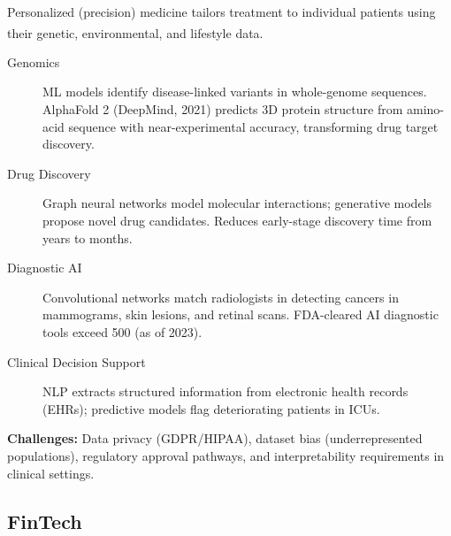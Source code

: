     \begin{tcbitemize}[ skin=sectionraster ]
        \tcbitem[title={AI in Personalized Medicine}, raster multicolumn=6]
        Personalized (precision) medicine tailors treatment to individual patients using their genetic, environmental, and lifestyle data.\textsuperscript{\cite{adjaouteAI2024}}

        \begin{description}
            \item[Genomics] ML models identify disease-linked variants in whole-genome sequences. AlphaFold 2 (DeepMind, 2021) predicts 3D protein structure from amino-acid sequence with near-experimental accuracy, transforming drug target discovery.
            \item[Drug Discovery] Graph neural networks model molecular interactions; generative models propose novel drug candidates. Reduces early-stage discovery time from years to months.
            \item[Diagnostic AI] Convolutional networks match radiologists in detecting cancers in mammograms, skin lesions, and retinal scans. FDA-cleared AI diagnostic tools exceed 500 (as of 2023).
            \item[Clinical Decision Support] NLP extracts structured information from electronic health records (EHRs); predictive models flag deteriorating patients in ICUs.
        \end{description}

        \textbf{Challenges:} Data privacy (GDPR/HIPAA), dataset bias (underrepresented populations), regulatory approval pathways, and interpretability requirements in clinical settings.
    \end{tcbitemize}

    \subsection{FinTech}

